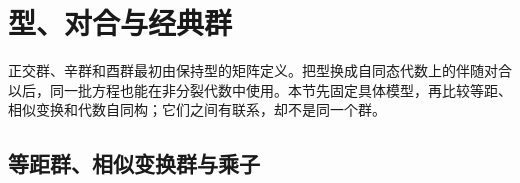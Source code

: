 %
%

\section{型、对合与经典群}
\label{b5:sec:2105}


正交群、辛群和酉群最初由保持型的矩阵定义。把型换成自同态代数上的伴随对合以后，同一批方程也能在非分裂代数中使用。本节先固定具体模型，再比较等距、相似变换和代数自同构；它们之间有联系，却不是同一个群。

\subsection{等距群、相似变换群与乘子}
\label{b5:subsec:2105:01}

